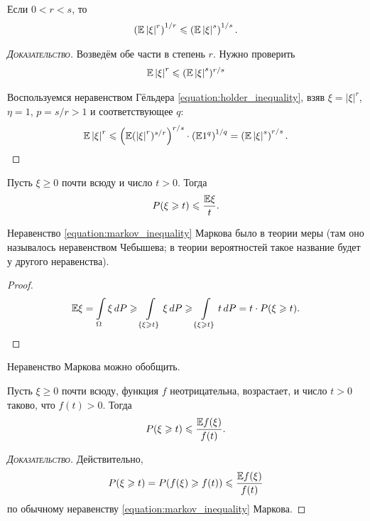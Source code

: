 \documentclass[../main.tex]{subfiles}
\begin{document}
\begin{prop}
 \label{proposition:Lyapunov_inequality}
 Если $ 0 < r < s $, то 
 \begin{align*}
  \left(\mathbb E \left| \xi \right|^{r} \right)^{1/r} \leqslant \left( \mathbb E \left| \xi \right|^{s} \right)^{1/s}.
 \end{align*} 
\end{prop}
\begin{proof}[\normalfont\textsc{Доказательство}]
 Возведём обе части в степень $r$. Нужно проверить 
 \begin{align*}
  \mathbb E \left|\xi\right|^r \leqslant (\mathbb E \left|\xi\right|^s)^{r/s}
 \end{align*}

 Воспользуемся неравенством Гёльдера \eqref{equation:holder_inequality}, взяв $ \xi = \left| \xi \right|^{r} $, $ \eta = 1 $, $ p = s / r > 1 $ и соответствующее $ q $:
 \begin{align*}
  \mathbb E \left| \xi \right|^{r} \leqslant \left( \mathbb E (\left| \xi \right|^{r})^{s / r} \right)^{r / s} \cdot \left( \mathbb E 1^{q} \right)^{1 / q} = \left( \mathbb E \left| \xi \right|^{s} \right)^{r / s}.
 \end{align*}
\end{proof}

\begin{prop}
 Пусть $ \xi \geqslant 0 $ почти всюду и число $ t > 0 $. Тогда
 \begin{align}
  \label{equation:markov_inequality}
  P(\xi \geqslant t) \leqslant \frac{\mathbb E \xi}{t}.
 \end{align}  
\end{prop}

Неравенство \eqref{equation:markov_inequality} Маркова было в теории меры (там оно называлось неравенством Чебышева; в теории вероятностей такое название будет у другого неравенства).

\begin{proof}
 \begin{align*}
  \mathbb E \xi = \int\limits_{\Omega} \xi\,dP \geqslant \int\limits_{\left\{ \xi \geqslant t \right\}} \xi \,dP \geqslant \int\limits_{\left\{ \xi \geqslant t \right\}}  t\,dP = t \cdot P(\xi \geqslant t).
 \end{align*}
\end{proof}

Неравенство Маркова можно обобщить.

\begin{prop}
 Пусть $ \xi \geqslant 0 $ почти всюду, функция $f$ неотрицательна, возрастает, и число $ t > 0 $ таково, что $ f(t) > 0 $. Тогда
 \begin{align*}
  P(\xi \geqslant t) \leqslant \frac{\mathbb E f(\xi)}{f(t)}.
 \end{align*}
\end{prop}
\begin{proof}[\normalfont\textsc{Доказательство}]
 Действительно,
 \begin{align*}
  P(\xi \geqslant t) = P(f(\xi) \geqslant f(t)) \leqslant \frac{\mathbb E f(\xi)}{f(t)}
 \end{align*} по обычному неравенству \eqref{equation:markov_inequality} Маркова.
\end{proof}
\end{document}
